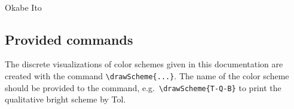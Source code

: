\documentclass{scrartcl}
\newcommand\marg[1]{\leavevmode\marginpar{\raggedleft #1}}
\begin{document}
\begin{center}
    \\
    Okabe Ito
\end{center}

\subsection{Provided commands}
\cprotect\marg{\verb!\drawScheme{...}!}%
The discrete visualizations of color schemes given in this documentation are created with the command \verb!\drawScheme{...}!.
The name of the color scheme should be provided to the command, e.g.\ \verb!\drawScheme{T-Q-B}! to print the qualitative bright scheme by Tol.

\printbibliography
\end{document}

